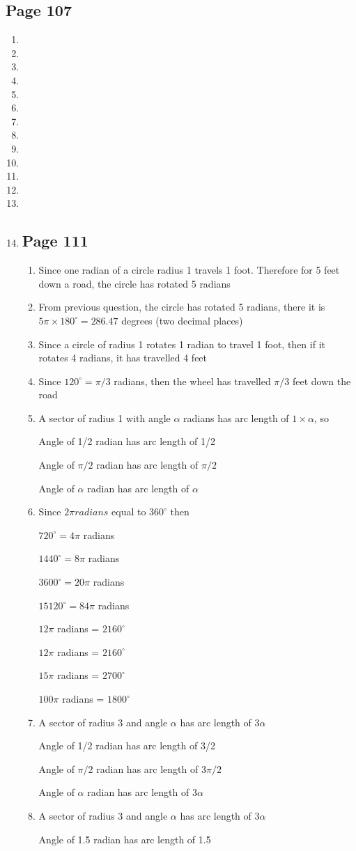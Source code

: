 \documentclass{article}
\newenvironment{solutions}[1]
{\subsection*{#1}
 \begin{enumerate}[leftmargin=1.5em]}
{\end{enumerate}}
\newcommand{\solution}{\item}
\begin{document}
\begin{solutions}{Page 107}
\solution
\solution
\solution
\solution
\solution
\solution
\solution
\solution
\solution
\solution
\solution
\solution
\solution
\solution

\begin{solutions}{Page 111}
\solution
Since one radian of a circle radius 1 travels 1 foot. Therefore for 5 feet down a road, the circle has rotated 5 radians

\solution
From previous question, the circle has rotated 5 radians, there it is $5 \pi \times 180^{\circ}=286.47$ degrees (two decimal places)

\solution
Since a circle of radius 1 rotates 1 radian to travel 1 foot, then if it rotates 4 radians, it has travelled 4 feet

\solution
Since $120^{\circ} = \pi/3$ radians, then the wheel has travelled $\pi/3$ feet down the road

\solution
A sector of radius 1 with angle $\alpha$ radians has arc length of $1 \times \alpha$, so

Angle of 1/2 radian has arc length of 1/2

Angle of $\pi/2$ radian has arc length of $\pi/2$

Angle of $\alpha$ radian has arc length of $\alpha$

\solution
Since $2\pi radians$ equal to $360^{\circ}$ then

$720^{\circ} = 4\pi$ radians

$1440^{\circ} = 8\pi$ radians

$3600^{\circ} = 20\pi$ radians

$15120^{\circ} = 84\pi$ radians

$12\pi$ radians = $2160^{\circ}$

$12\pi$ radians = $2160^{\circ}$

$15\pi$ radians = $2700^{\circ}$

$100\pi$ radians = $1800^{\circ}$

\solution
A sector of radius 3 and angle $\alpha$ has arc length of $3\alpha$

Angle of 1/2 radian has arc length of 3/2

Angle of $\pi/2$ radian has arc length of $3\pi/2$

Angle of $\alpha$ radian has arc length of $3\alpha$

\solution
A sector of radius 3 and angle $\alpha$ has arc length of $3\alpha$

Angle of 1.5 radian has arc length of 1.5


\end{solutions}
\end{solutions}
\end{document}
